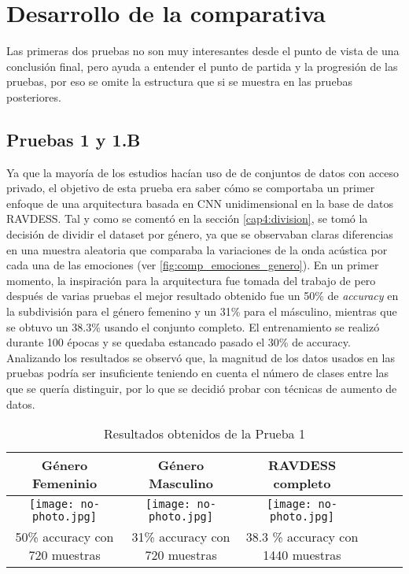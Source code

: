 \documentclass[11pt,a4paper,spanish]{book}
\begin{document}
	\chapter{Desarrollo de la comparativa}
	Las primeras dos pruebas no son muy interesantes desde el punto de vista de una conclusión final, pero ayuda a entender el punto de partida y la progresión de las pruebas, por eso se omite la estructura que si se muestra en las pruebas posteriores.
	
		\section{Pruebas 1 y 1.B}
		Ya que la mayoría de los estudios hacían uso de de conjuntos de datos con acceso privado, el objetivo de esta prueba era saber cómo se comportaba un primer enfoque de una arquitectura basada en CNN unidimensional en la base de datos RAVDESS. Tal y como se comentó en la sección \ref{cap4:division}, se tomó la decisión de dividir el dataset por género, ya que se observaban claras diferencias en una muestra aleatoria que comparaba la variaciones de la onda acústica por cada una de las emociones (ver \ref{fig:comp_emociones_genero}). En un primer momento, la inspiración para la arquitectura fue tomada del trabajo de \cite{blabla} pero después de varias pruebas el mejor resultado obtenido fue un 50\% de \emph{accuracy} en la subdivisión para el género femenino y un 31\% para el másculino, mientras que se obtuvo un 38.3\% usando el conjunto completo. El entrenamiento se realizó durante 100 épocas y se quedaba estancado pasado el 30\% de accuracy. Analizando los resultados se observó que, la magnitud de los datos usados en las pruebas podría ser insuficiente teniendo en cuenta el número de clases entre las que se quería distinguir, por lo que se decidió probar con técnicas de aumento de datos.
		\begin{table}[H]
			\centering
			\begin{center}
				\begin{tabular}{| c | c | c | c | c | c |}
					\hline
					Género Femeninio & Género Masculino & RAVDESS completo \\ 
					\hline
					\texttt{[image: no-photo.jpg]} & \texttt{[image: no-photo.jpg]} & \texttt{[image: no-photo.jpg]}\\
					\hline
					50\% accuracy con 720 muestras & 31\%  accuracy con 720 muestras & 38.3 \% accuracy con 1440 muestras \\
					\hline	
				\end{tabular}
				\caption{Resultados obtenidos de la Prueba 1}
			\end{center}
		\end{table}
	
\end{document}

